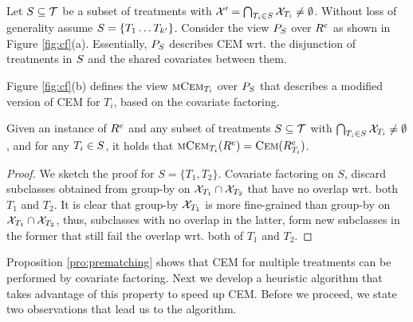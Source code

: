 



Let $S \subseteq {{\mathcal{T}}}$ be a subset of treatments
with ${{\mathcal{X}'}}= \bigcap_{T_i \in S} {{\mathcal{X}}}_{T_i} \not = \emptyset$. Without loss of generality assume $S=\{T_1 \ldots T_{k'}\}$.
 Consider the view ${{P}_{S}}$ over ${{R}^e}$ as shown in Figure \ref{fig:cf}(a). Essentially, ${{P}_{S}}$ describes CEM wrt. the disjunction
 of treatments in $S$ and the shared covariates between them.   Figure \ref{fig:cf}(b) defines the view ${\textsc{mCem}_{T_i}}$ over ${{P}_{S}}$ that describes a modified version of CEM for $T_i$,
based on the covariate factoring.  

\vspace{-0.2cm}
\begin{proposition} \label{pro:prematching}
Given an  instance of ${{R}^e}$ and any subset of treatments $S\subseteq {{\mathcal{T}}}$ with
$\bigcap_{T_i \in S} {{\mathcal{X}}}_{T_i} \not = \emptyset$, and for any $T_i \in S$, it holds that ${\textsc{mCem}_{T_i}}({{R}^e})={\textsc{Cem}}({{R}^e_{T_i}})$.
\end{proposition}
\vspace{-0.1cm}

\begin{proof}
  We sketch the proof for $S=\{T_1, T_2\}$. Covariate factoring on $S$, discard subclasses obtained from group-by
  on ${{\mathcal{X}}}_{T_1} \cap {{\mathcal{X}}}_{T_2}$ that have no overlap wrt. both $T_1$ and $T_2$. It is clear that group-by ${{\mathcal{X}}}_{T_1}$ is more fine-grained  than group-by on ${{\mathcal{X}}}_{T_1} \cap {{\mathcal{X}}}_{T_2}$, thus, subclasses with no overlap in the latter, form new subclasses in the former that still fail the overlap wrt. both of $T_1$ and $T_2$.
\end{proof}
Proposition \ref{pro:prematching} shows that CEM for multiple treatments can be performed by covariate factoring.
Next we develop a heuristic algorithm that takes advantage of this property to speed up CEM.
Before we proceed, we  state two observations that lead us to the algorithm.

